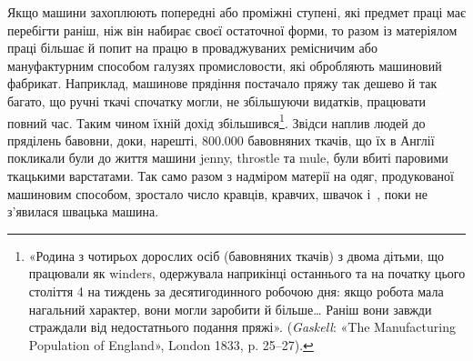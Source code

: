 Якщо машини захоплюють попередні або проміжні ступені,
які предмет праці має перебігти раніш, ніж він набирає своєї
остаточної форми, то разом із матеріялом праці більшає й попит
на працю в проваджуваних ремісничим або мануфактурним способом
галузях промисловости, які обробляють машиновий
фабрикат. Наприклад, машинове прядіння постачало пряжу так
дешево й так багато, що ручні ткачі спочатку могли, не збільшуючи
видатків, працювати повний час. Таким чином їхній дохід
збільшився\footnote{
«Родина з чотирьох дорослих осіб (бавовняних ткачів) з двома
дітьми, що працювали як winders, одержувала наприкінці останнього та
на початку цього століття 4 на тиждень за десятигодинного
робочою дня: якщо робота мала нагальний характер, вони могли
заробити й більше\dots{} Раніш вони завжди страждали від недостатнього
подання пряжі». (\emph{Gaskell}: «The Manufacturing Population of England»,
London 1833, p. 25--27).
}. Звідси наплив людей до пряділень бавовни,
доки, нарешті, \num{800.000} бавовняних ткачів, що їх в Англії покликали
були до життя машини jenny, throstle та mule, були
вбиті паровими ткацькими варстатами. Так само разом з надміром
матерії на одяг, продукованої машиновим способом, зростало
число кравців, кравчих, швачок і~, поки не з’явилася
швацька машина.
